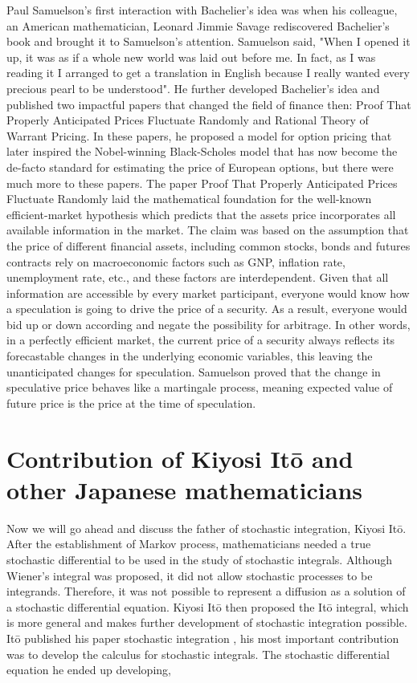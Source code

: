 \documentclass{article}
\begin{document}
Paul Samuelson's first interaction with Bachelier’s idea was when his colleague, an American mathematician, Leonard Jimmie Savage rediscovered Bachelier’s book and brought it to Samuelson’s attention. Samuelson said, "When I opened it up, it was as if a whole new world was laid out before me. In fact, as I was reading it I arranged to get a translation in English because I really wanted every precious pearl to be understood". He further developed Bachelier's idea and published two impactful papers that changed the field of finance then: Proof That Properly Anticipated Prices Fluctuate Randomly\cite{Sam2} and Rational Theory of Warrant Pricing\cite{Sam1}. In these papers, he proposed a model for option pricing that later inspired the Nobel-winning Black-Scholes model that has now become the de-facto standard for estimating the price of European options, but there were much more to these papers. The paper Proof That Properly Anticipated Prices Fluctuate Randomly\cite{Sam2} laid the mathematical foundation for the well-known efficient-market hypothesis \cite{Fama1} which predicts that the assets price incorporates all available information in the market.  The claim was based on the assumption that the price of different financial assets, including common stocks, bonds and futures contracts rely on macroeconomic factors such as GNP, inflation rate, unemployment rate, etc., and these factors are interdependent. Given that all information are accessible by every market participant, everyone would know how a speculation is going to drive the price of a security. As a result, everyone would bid up or down according and negate the possibility for arbitrage. In other words, in a perfectly efficient market, the current price of a security always reflects its forecastable changes in the underlying economic variables, this leaving the unanticipated changes for speculation. Samuelson proved that the change in speculative price behaves like a martingale process, meaning expected value of future price is the price at the time of speculation. \\


\section{Contribution of Kiyosi It\={o} and other Japanese mathematicians
}

Now we will go ahead and discuss the father of stochastic integration, Kiyosi It\={o}.  After the establishment of Markov process, mathematicians needed a true stochastic differential to be used in the study of stochastic integrals. Although Wiener’s integral \cite{Wei1}  was proposed, it did not allow stochastic processes to be integrands. Therefore, it was not possible to represent a diffusion as a solution of a stochastic differential equation. Kiyosi It\={o} then proposed the It\={o} integral, which is more general and makes further development of stochastic integration possible. It\={o} published his paper stochastic integration \cite{Ito1}, his most important contribution was to develop the calculus for stochastic integrals.  The stochastic differential equation he ended up developing,\\
\end{document}
